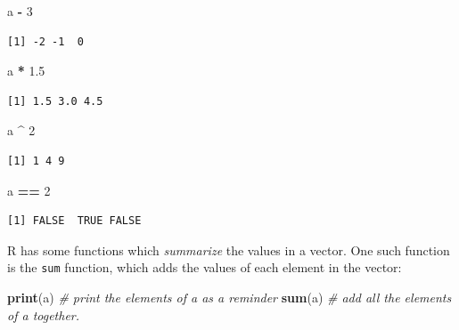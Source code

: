 \documentclass[
]{article}
\newenvironment{Shaded}{\begin{snugshade}}{\end{snugshade}}
\newcommand{\CommentTok}[1]{\textcolor[rgb]{0.56,0.35,0.01}{\textit{#1}}}
\newcommand{\DecValTok}[1]{\textcolor[rgb]{0.00,0.00,0.81}{#1}}
\newcommand{\FloatTok}[1]{\textcolor[rgb]{0.00,0.00,0.81}{#1}}
\newcommand{\KeywordTok}[1]{\textcolor[rgb]{0.13,0.29,0.53}{\textbf{#1}}}
\newcommand{\NormalTok}[1]{#1}
\newcommand{\OperatorTok}[1]{\textcolor[rgb]{0.81,0.36,0.00}{\textbf{#1}}}
\newcommand{\StringTok}[1]{\textcolor[rgb]{0.31,0.60,0.02}{#1}}
\begin{document}
\begin{Shaded}
\begin{Highlighting}[]
\NormalTok{a }\OperatorTok{-}\StringTok{ }\DecValTok{3}
\end{Highlighting}
\end{Shaded}

\begin{verbatim}
[1] -2 -1  0
\end{verbatim}

\begin{Shaded}
\begin{Highlighting}[]
\NormalTok{a }\OperatorTok{*}\StringTok{ }\FloatTok{1.5}
\end{Highlighting}
\end{Shaded}

\begin{verbatim}
[1] 1.5 3.0 4.5
\end{verbatim}

\begin{Shaded}
\begin{Highlighting}[]
\NormalTok{a }\OperatorTok{^}\StringTok{ }\DecValTok{2}
\end{Highlighting}
\end{Shaded}

\begin{verbatim}
[1] 1 4 9
\end{verbatim}

\begin{Shaded}
\begin{Highlighting}[]
\NormalTok{a }\OperatorTok{==}\StringTok{ }\DecValTok{2}
\end{Highlighting}
\end{Shaded}

\begin{verbatim}
[1] FALSE  TRUE FALSE
\end{verbatim}

R has some functions which \emph{summarize} the values in a vector.
One such function is the \texttt{sum} function, which adds the values of each element in the vector:

\begin{Shaded}
\begin{Highlighting}[]
\KeywordTok{print}\NormalTok{(a)  }\CommentTok{# print the elements of a as a reminder}
\KeywordTok{sum}\NormalTok{(a)    }\CommentTok{# add all the elements of a together.}
\end{Highlighting}
\end{Shaded}
\end{document}
